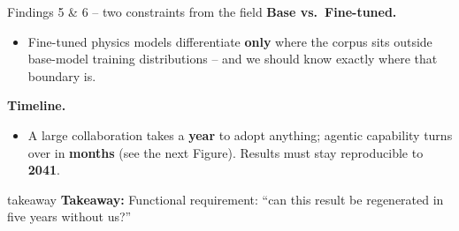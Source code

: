 \documentclass[aspectratio=169,11pt]{beamer}
\newcommand{\takeaway}[1]{%
  \vfill
  \begin{beamercolorbox}[wd=\textwidth,sep=0.45em]{takeaway}
    \small\textbf{Takeaway:} #1
  \end{beamercolorbox}%
}
\newcommand{\lead}[1]{\textcolor{fpaccent}{\textbf{#1}}}
\begin{document}
\begin{frame}{Findings 5 \& 6 -- two constraints from the field}
  \small
  \lead{Base vs.\ Fine-tuned.}
  \begin{itemize}\setlength\itemsep{0.2em}
    \item Fine-tuned physics models differentiate \textbf{only} where the corpus sits outside base-model training distributions -- and we should know exactly where that boundary is.
  \end{itemize}
  \vspace{0.4em}
  \lead{Timeline.}
  \begin{itemize}\setlength\itemsep{0.2em}
    \item A large collaboration takes a \textbf{year} to adopt anything; agentic capability turns over in \textbf{months} (see the next Figure). Results must stay reproducible to \textbf{2041}.
  \end{itemize}
  \takeaway{Functional requirement: ``can this result be regenerated in five years without us?''}
\end{frame}

\end{document}
